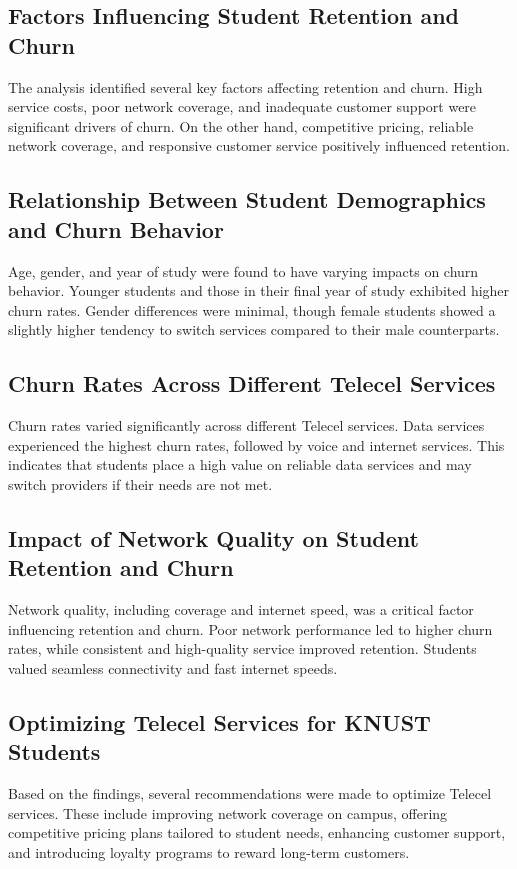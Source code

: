 \documentclass[doublespacing]{report} %
\begin{document}
\subsection{Factors Influencing Student Retention and Churn}
The analysis identified several key factors affecting retention and churn. High service costs, poor network coverage, and inadequate customer support were significant drivers of churn. On the other hand, competitive pricing, reliable network coverage, and responsive customer service positively influenced retention.

\subsection{Relationship Between Student Demographics and Churn Behavior}
Age, gender, and year of study were found to have varying impacts on churn behavior. Younger students and those in their final year of study exhibited higher churn rates. Gender differences were minimal, though female students showed a slightly higher tendency to switch services compared to their male counterparts.

\subsection{Churn Rates Across Different Telecel Services}
Churn rates varied significantly across different Telecel services. Data services experienced the highest churn rates, followed by voice and internet services. This indicates that students place a high value on reliable data services and may switch providers if their needs are not met.

\subsection{Impact of Network Quality on Student Retention and Churn}
Network quality, including coverage and internet speed, was a critical factor influencing retention and churn. Poor network performance led to higher churn rates, while consistent and high-quality service improved retention. Students valued seamless connectivity and fast internet speeds.

\subsection{Optimizing Telecel Services for KNUST Students}
Based on the findings, several recommendations were made to optimize Telecel services. These include improving network coverage on campus, offering competitive pricing plans tailored to student needs, enhancing customer support, and introducing loyalty programs to reward long-term customers.
\end{document}
